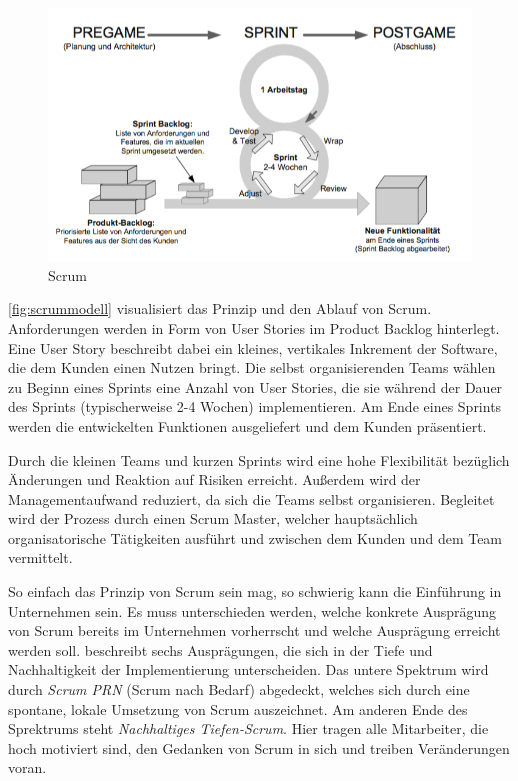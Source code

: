 \begin{figure}
  \centering
  \includegraphics[width=\textwidth]{img/scrummodell.png}
  \caption{Scrum \parencite[][]{Schatten:2010aa}}
  \label{fig:scrummodell}
\end{figure}

\autoref{fig:scrummodell} visualisiert das Prinzip und den Ablauf von Scrum.
Anforderungen werden in Form von User Stories im Product Backlog hinterlegt.
Eine User Story beschreibt dabei ein kleines, vertikales Inkrement der Software, die dem Kunden einen Nutzen bringt.
Die selbst organisierenden Teams wählen zu Beginn eines Sprints eine Anzahl von User Stories, die sie während der Dauer des Sprints (typischerweise 2-4 Wochen) implementieren.
Am Ende eines Sprints werden die entwickelten Funktionen ausgeliefert und dem Kunden präsentiert.

Durch die kleinen Teams und kurzen Sprints wird eine hohe Flexibilität bezüglich Änderungen und Reaktion auf Risiken erreicht.
Außerdem wird der Managementaufwand reduziert, da sich die Teams selbst organisieren.
Begleitet wird der Prozess durch einen Scrum Master, welcher hauptsächlich organisatorische Tätigkeiten ausführt und zwischen dem Kunden und dem Team vermittelt.

So einfach das Prinzip von Scrum sein mag, so schwierig kann die Einführung in Unternehmen sein.
Es muss unterschieden werden, welche konkrete Ausprägung von Scrum bereits im Unternehmen vorherrscht und welche Ausprägung erreicht werden soll.
\parencite[][S. 3ff]{maximini2012scrum} beschreibt sechs Ausprägungen, die sich in der Tiefe und Nachhaltigkeit der Implementierung unterscheiden.
Das untere Spektrum wird durch \emph{Scrum PRN} (Scrum nach Bedarf) abgedeckt, welches sich durch eine spontane, lokale Umsetzung von Scrum auszeichnet.
Am anderen Ende des Sprektrums steht \emph{Nachhaltiges Tiefen-Scrum}.
Hier tragen alle Mitarbeiter, die hoch motiviert sind, den Gedanken von Scrum in sich und treiben Veränderungen voran.

